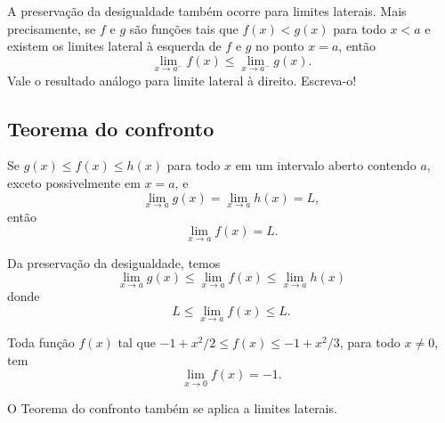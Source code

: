 \begin{obs}
  A preservação da desigualdade também ocorre para limites laterais. Mais precisamente, se $f$ e $g$ são funções tais que $f(x)<g(x)$ para todo $x < a$ e existem os limites lateral à esquerda de $f$ e $g$ no ponto $x=a$, então
  \begin{equation}
    \lim_{x\to a^-} f(x) \leq \lim_{x\to a^-} g(x).
  \end{equation}
  Vale o resultado análogo para limite lateral à direito. Escreva-o!
\end{obs}

\subsection{Teorema do confronto}

\begin{teo}\label{teo:confronto}
  Se $g(x) \leq f(x) \leq h(x)$ para todo $x$ em um intervalo aberto contendo $a$, exceto possivelmente em $x=a$, e
  \begin{equation}
    \lim_{x\to a} g(x) = \lim_{x\to a} h(x) = L,
  \end{equation}
  então
  \begin{equation}
    \lim_{x\to a} f(x) = L.
  \end{equation}
\end{teo}
\begin{dem}
  Da preservação da desigualdade, temos
  \begin{equation}
    \lim_{x\to a} g(x) \leq \lim_{x\to a} f(x) \leq \lim_{x\to a} h(x)
  \end{equation}
  donde
  \begin{equation}
    L \leq \lim_{x\to a} f(x) \leq L.
  \end{equation}
\end{dem}

\begin{exer}
  Toda função $f(x)$ tal que $-1+x^2/2 \leq f(x) \leq -1+x^2/3$, para todo $x\neq 0$, tem
  \begin{equation}
    \lim_{x\to 0} f(x) = -1.
  \end{equation}
\end{exer}

\begin{obs}
  O Teorema do confronto também se aplica a limites laterais.
\end{obs}

